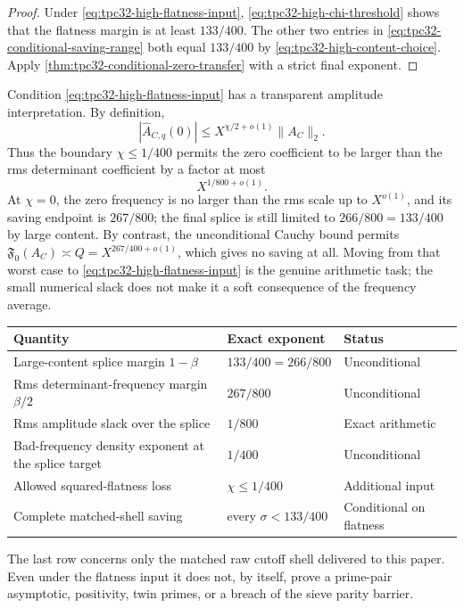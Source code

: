 \begin{proof}
Under \eqref{eq:tpc32-high-flatness-input},
\eqref{eq:tpc32-high-chi-threshold} shows that the flatness margin is at
least $133/400$.  The other two entries in
\eqref{eq:tpc32-conditional-saving-range} both equal $133/400$ by
\eqref{eq:tpc32-high-content-choice}.  Apply
\cref{thm:tpc32-conditional-zero-transfer} with a strict final
exponent.
\end{proof}

Condition \eqref{eq:tpc32-high-flatness-input} has a transparent
amplitude interpretation.  By definition,
\begin{equation}
 |\widehat A_{C,q}(0)|
 \le X^{\chi/2+o(1)}\|A_C\|_2.
 \label{eq:tpc32-high-amplitude-flatness}
\end{equation}
Thus the boundary $\chi\le1/400$ permits the zero coefficient to be larger
than the rms determinant coefficient by a factor at most
\begin{equation}
 X^{1/800+o(1)}.
 \label{eq:tpc32-high-amplitude-inflation}
\end{equation}
At $\chi=0$, the zero frequency is no larger than the rms scale up to
$X^{o(1)}$, and its saving endpoint is $267/800$; the final splice is
still limited to $266/800=133/400$ by large content.  By contrast,
the unconditional Cauchy bound permits
$\mathfrak F_0(A_C)\asymp Q=X^{267/400+o(1)}$, which gives no saving at
all.  Moving from that worst case to
\eqref{eq:tpc32-high-flatness-input} is the genuine arithmetic task;
the small numerical slack does not make it a soft consequence of the
frequency average.

\begin{center}
\begin{tabular}{>{\raggedright\arraybackslash}p{}
                >{\centering\arraybackslash}p{}
                >{\raggedright\arraybackslash}p{}}
\toprule
Quantity & Exact exponent & Status \\
\midrule
Large-content splice margin $1-\beta$
& $133/400=266/800$ & Unconditional \\
\addlinespace
Rms determinant-frequency margin $\beta/2$
& $267/800$ & Unconditional \\
\addlinespace
Rms amplitude slack over the splice
& $1/800$ & Exact arithmetic \\
\addlinespace
Bad-frequency density exponent at the splice target
& $1/400$ & Unconditional \\
\addlinespace
Allowed squared-flatness loss
& $\chi\le1/400$ & Additional input \\
\addlinespace
Complete matched-shell saving
& every $\sigma<133/400$ & Conditional on flatness \\
\bottomrule
\end{tabular}
\end{center}

The last row concerns only the matched raw cutoff shell delivered to
this paper.  Even under the flatness input it does not, by itself,
prove a prime-pair asymptotic, positivity, twin primes, or a breach of
the sieve parity barrier.
